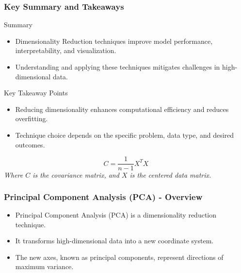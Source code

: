 \documentclass[aspectratio=169]{beamer}
\begin{document}
\begin{frame}[fragile]
    \frametitle{Key Summary and Takeaways}
    \begin{block}{Summary}
        \begin{itemize}
            \item Dimensionality Reduction techniques improve model performance, interpretability, and visualization.
            \item Understanding and applying these techniques mitigates challenges in high-dimensional data.
        \end{itemize}
    \end{block}
    \begin{block}{Key Takeaway Points}
        \begin{itemize}
            \item Reducing dimensionality enhances computational efficiency and reduces overfitting.
            \item Technique choice depends on the specific problem, data type, and desired outcomes.
        \end{itemize}
    \end{block}
    \begin{equation}
        C = \frac{1}{n-1} X^T X 
    \end{equation}
    \textit{Where \( C \) is the covariance matrix, and \( X \) is the centered data matrix.}
\end{frame}

\begin{frame}[fragile]
    \frametitle{Principal Component Analysis (PCA) - Overview}
    \begin{itemize}
        \item Principal Component Analysis (PCA) is a dimensionality reduction technique.
        \item It transforms high-dimensional data into a new coordinate system.
        \item The new axes, known as principal components, represent directions of maximum variance.
    \end{itemize}
\end{frame}
\end{document}
